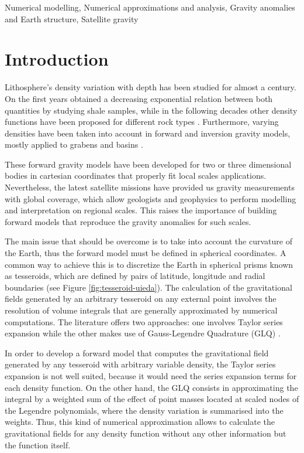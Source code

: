 \documentclass[extra]{gji}
\begin{document}
\begin{keywords}
Numerical modelling, Numerical approximations and analysis, Gravity anomalies 
and Earth structure, Satellite gravity
\end{keywords}


\section{Introduction}

Lithosphere's density variation with depth has been studied for almost a 
century.
On the first years \citet{Athy1930} obtained a decreasing exponential relation 
between both quantities by studying shale samples, while in the following 
decades other density functions have been proposed for different rock types 
\citep[e.g.,][]{Maxant1980, Rao1986, Rao1993, Rao1994}. 
Furthermore, varying densities have been taken into account in forward and 
inversion gravity models, mostly applied to grabens and basins 
\citep{Cordell1973, Rao1986, Cowie1990, Rao1993, Rao1994, Zhang2001, 
Welford2010}.

These forward gravity models have been developed for two or three dimensional 
bodies in cartesian coordinates that properly fit local scales applications. 
Nevertheless, the latest satellite missions have provided us gravity 
measurements with global coverage, which allow geologists and geophysics to 
perform modelling and interpretation on regional scales. This raises the 
importance of building forward models that reproduce the gravity anomalies for 
such scales.

The main issue that should be overcome is to take into account the curvature 
of the Earth, thus the forward model must be defined in spherical coordinates. 
A common way to achieve this is to discretize the Earth in spherical prisms 
known as tesseroids, which are defined by pairs of latitude, longitude and 
radial boundaries (see Figure \ref{fig:tesseroid-uieda}).
The calculation of the gravitational fields generated by an arbitrary 
tesseroid on any external point involves the resolution of volume 
integrals that are generally approximated by numerical computations.
The literature offers two approaches: one involves Taylor series expansion 
\citep{Heck2007, Grombein2013} while the other makes use of Gauss-Legendre 
Quadrature (GLQ) \citep{Asgharzadeh2007, Uieda2016, Uieda2017}.

In order to develop a forward model that computes the gravitational 
field generated by any tesseroid with arbitrary variable density, the 
Taylor series expansion is not well suited, because it would need the 
series expansion terms for each density function.
On the other hand, the GLQ consists in approximating the integral by a 
weighted sum of the effect of point masses located at scaled nodes of the 
Legendre polynomials, where the density variation is summarised into the 
weights.
Thus, this kind of numerical approximation allows to calculate the 
gravitational fields for any density function without any other 
information but the function itself.
\end{document}

